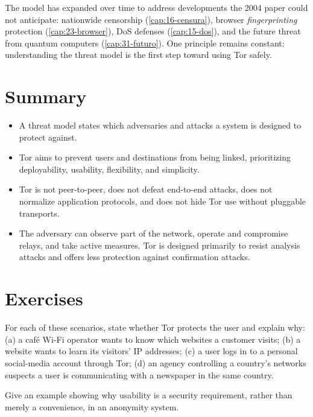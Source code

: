 The model has expanded over time to address developments the 2004 paper could not anticipate: nationwide censorship (\cref{cap:16-censura}), browser \emph{fingerprinting} protection (\cref{cap:23-browser}), DoS defenses (\cref{cap:15-dos}), and the future threat from quantum computers (\cref{cap:31-futuro}). One principle remains constant: understanding the threat model is the first step toward using Tor safely.

\section*{Summary}
\begin{itemize}
  \item A threat model states which adversaries and attacks a system is designed to protect against.
  \item Tor aims to prevent users and destinations from being linked, prioritizing deployability, usability, flexibility, and simplicity.
  \item Tor is not peer-to-peer, does not defeat end-to-end attacks, does not normalize application protocols, and does not hide Tor use without pluggable transports.
  \item The adversary can observe part of the network, operate and compromise relays, and take active measures. Tor is designed primarily to resist analysis attacks and offers less protection against confirmation attacks.
\end{itemize}

\section*{Exercises}

\begin{esercizio}[1]\label{es:04-casi}
For each of these scenarios, state whether Tor protects the user and explain why: (a) a café Wi-Fi operator wants to know which websites a customer visits; (b) a website wants to learn its visitors' IP addresses; (c) a user logs in to a personal social-media account through Tor; (d) an agency controlling a country's networks suspects a user is communicating with a newspaper in the same country.
\end{esercizio}

\begin{esercizio}[2]\label{es:04-usabilita}
Give an example showing why usability is a security requirement, rather than merely a convenience, in an anonymity system.
\end{esercizio}

